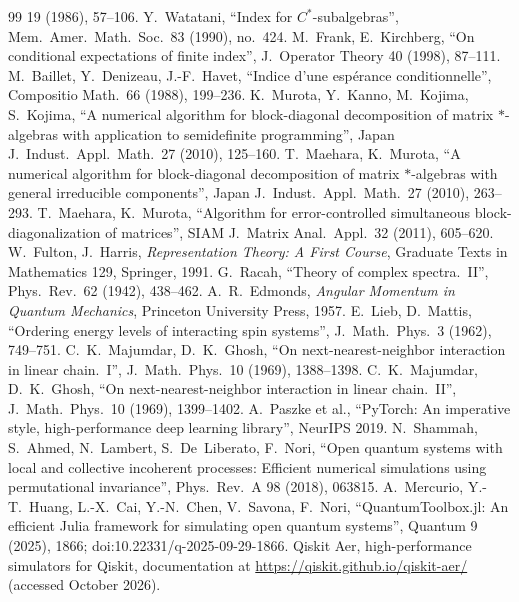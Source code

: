 \documentclass[11pt]{article}
\begin{document}
{\begin{thebibliography}{99}
  19 (1986), 57--106.
 Y.~Watatani, ``Index for $C^*$-subalgebras'', Mem.\ Amer.\ Math.\ Soc.\ 83 (1990), no.~424.
 M.~Frank, E.~Kirchberg, ``On conditional expectations of finite index'', J.\ Operator Theory 40
  (1998), 87--111.
 M.~Baillet, Y.~Denizeau, J.-F.~Havet, ``Indice d'une esp\'erance conditionnelle'', Compositio
  Math.\ 66 (1988), 199--236.
 K.~Murota, Y.~Kanno, M.~Kojima, S.~Kojima, ``A numerical algorithm for block-diagonal
  decomposition of matrix $*$-algebras with application to semidefinite programming'', Japan J.\ Indust.\ Appl.\
  Math.\ 27 (2010), 125--160.
 T.~Maehara, K.~Murota, ``A numerical algorithm for block-diagonal decomposition of matrix
  $*$-algebras with general irreducible components'', Japan J.\ Indust.\ Appl.\ Math.\ 27 (2010), 263--293.
\bibitem{maehara2011} T.~Maehara, K.~Murota, ``Algorithm for error-controlled simultaneous block-diagonalization of
  matrices'', SIAM J.\ Matrix Anal.\ Appl.\ 32 (2011), 605--620.
\bibitem{fulton1991} W.~Fulton, J.~Harris, \emph{Representation Theory: A First Course}, Graduate Texts in
  Mathematics 129, Springer, 1991.
 G.~Racah, ``Theory of complex spectra.~II'', Phys.\ Rev.\ 62 (1942), 438--462.
\bibitem{edmonds1957} A.~R.~Edmonds, \emph{Angular Momentum in Quantum Mechanics}, Princeton University Press, 1957.
\bibitem{lieb1962} E.~Lieb, D.~Mattis, ``Ordering energy levels of interacting spin systems'', J.\ Math.\ Phys.\ 3
  (1962), 749--751.
 C.~K.~Majumdar, D.~K.~Ghosh, ``On next-nearest-neighbor interaction in linear chain.~I'',
  J.\ Math.\ Phys.\ 10 (1969), 1388--1398.
 C.~K.~Majumdar, D.~K.~Ghosh, ``On next-nearest-neighbor interaction in linear chain.~II'',
  J.\ Math.\ Phys.\ 10 (1969), 1399--1402.
 A.~Paszke et al., ``PyTorch: An imperative style, high-performance deep learning
  library'', NeurIPS 2019.
 N.~Shammah, S.~Ahmed, N.~Lambert, S.~De~Liberato, F.~Nori, ``Open quantum systems with local
  and collective incoherent processes: Efficient numerical simulations using permutational invariance'',
  Phys.\ Rev.\ A 98 (2018), 063815.
 A.~Mercurio, Y.-T.~Huang, L.-X.~Cai, Y.-N.~Chen, V.~Savona, F.~Nori, ``QuantumToolbox.jl: An
  efficient Julia framework for simulating open quantum systems'', Quantum 9 (2025), 1866;
  doi:10.22331/q-2025-09-29-1866.
 Qiskit Aer, high-performance simulators for Qiskit, documentation at
  \url{https://qiskit.github.io/qiskit-aer/} (accessed October 2026).

\end{thebibliography}}
\end{document}

